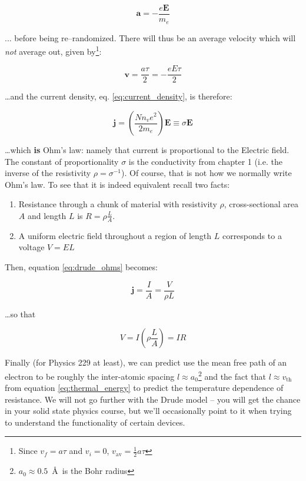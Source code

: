 \documentclass{tufte-book}
\begin{document}
\begin{equation}
\label{eq:coulomb_accel}
\textbf{a} = -\frac{e\textbf{E}}{m_e}
\end{equation}

\noindent... before being re--randomized. There will thus be an average velocity which will \textit{not} average out, given by\footnote{Since $v_f = a\tau$ and $v_i = 0$, $v_\text{av} = \frac{1}{2}a\tau$}:

\begin{equation}
\label{eq:drude_avg_velocity}
\textbf{v} = \frac{a\tau}{2} = -\frac{eE\tau}{2}
\end{equation}

\noindent\ldots and the current density, eq. \ref{eq:current_density}, is therefore:

\begin{equation}
\label{eq:drude_ohms}
\textbf{j} = \left(\frac{Nn_ve^2}{2m_e}\right)\textbf{E} \equiv \sigma\textbf{E}
\end{equation}

\noindent\ldots which \textbf{is} Ohm's law: namely that current is proportional to the Electric field. The constant of proportionality $\sigma$ is the conductivity from chapter 1 (i.e. the inverse of the resistivity $\rho = \sigma^{-1}$). Of course, that is not how we normally write Ohm's law. To see that it is indeed equivalent recall two facts: 
\begin{enumerate}
  \item Resistance through a chunk of material with resistivity $\rho$, cross-sectional area $A$ and length $L$ is $R = \rho\frac{L}{A}$.
  \item A uniform electric field throughout a region of length $L$ corresponds to a voltage $V = EL$
\end{enumerate}

Then, equation \ref{eq:drude_ohms} becomes:

$$
\textbf{j} = \frac{I}{A} = \frac{V}{\rho L}
$$

\noindent \ldots so that 

\begin{equation}
\label{eq:drude_ohms2}
V = I\left(\rho\frac{L}{A}\right) = IR
\end{equation}

Finally (for Physics 229 at least), we can predict use the mean free path of an electron to be roughly the inter-atomic spacing $l\approx a_0$\footnote{$a_0 \approx 0.5$~\AA~is the Bohr radius} and the fact that $l \approx v_\text{th}$ from equation \ref{eq:thermal_energy} to predict the temperature dependence of resistance. We will not go further with the Drude model -- you will get the chance in your solid state physics course, but we'll occasionally point to it when trying to understand the functionality of certain devices.
\end{document}
